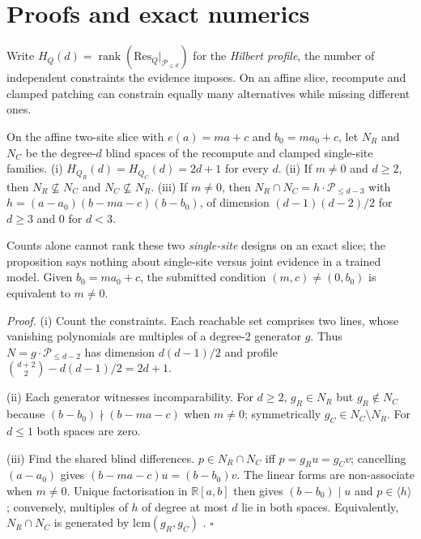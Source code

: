\section{Proofs and exact numerics}
\label{app:proofs}

Write $H_Q(d)=\operatorname{rank}(\mathrm{Res}_Q|_{\mathcal P_{\le d}})$ for the \emph{Hilbert profile}, the number of independent
constraints the evidence imposes. On an affine slice, recompute and clamped patching can constrain equally many
alternatives while missing different ones.
\begin{proposition}
\label{prop:incomparable}
On the affine two-site slice with $e(a)=ma+c$ and $b_0=ma_0+c$, let $N_R$ and $N_C$ be the degree-$d$ blind spaces
of the recompute and clamped single-site families. (i) $H_{Q_R}(d)=H_{Q_C}(d)=2d+1$ for every $d$. (ii) If $m\neq0$
and $d\ge2$, then $N_R\not\subseteq N_C$ and $N_C\not\subseteq N_R$. (iii) If $m\neq0$, then $N_R\cap N_C=h\cdot
\mathcal P_{\le d-3}$ with $h=(a-a_0)(b-ma-c)(b-b_0)$, of dimension $(d-1)(d-2)/2$ for $d\ge3$ and $0$ for $d<3$.
\end{proposition}

Counts alone cannot rank these two \emph{single-site} designs on an exact slice; the proposition says nothing about
single-site versus joint evidence in a trained model. Given $b_0=ma_0+c$, the submitted condition
$(m,c)\neq(0,b_0)$ is equivalent to $m\neq0$.

\emph{Proof.} (i) Count the constraints. Each reachable set comprises two lines, whose vanishing polynomials are
multiples of a degree-2 generator $g$. Thus $N=g\cdot\mathcal P_{\le d-2}$ has dimension $d(d-1)/2$ and profile
$\binom{d+2}{2}-d(d-1)/2=2d+1$.

(ii) Each generator witnesses incomparability. For $d\ge2$, $g_R\in N_R$ but $g_R\notin N_C$ because
$(b-b_0)\nmid(b-ma-c)$ when $m\neq0$; symmetrically $g_C\in N_C\setminus N_R$. For $d\le1$ both spaces are zero.

(iii) Find the shared blind differences. $p\in N_R\cap N_C$ iff $p=g_Ru=g_Cv$; cancelling $(a-a_0)$ gives
$(b-ma-c)u=(b-b_0)v$. The linear forms are non-associate when $m\neq0$. Unique factorisation in $\mathbb R[a,b]$
then gives $(b-b_0)\mid u$ and $p\in\langle h\rangle$; conversely, multiples of $h$ of degree at most $d$ lie in both spaces.
Equivalently, $N_R\cap N_C$ is generated by $\mathrm{lcm}(g_R,g_C)$ \citep{pistone1996groebner}. $\square$

